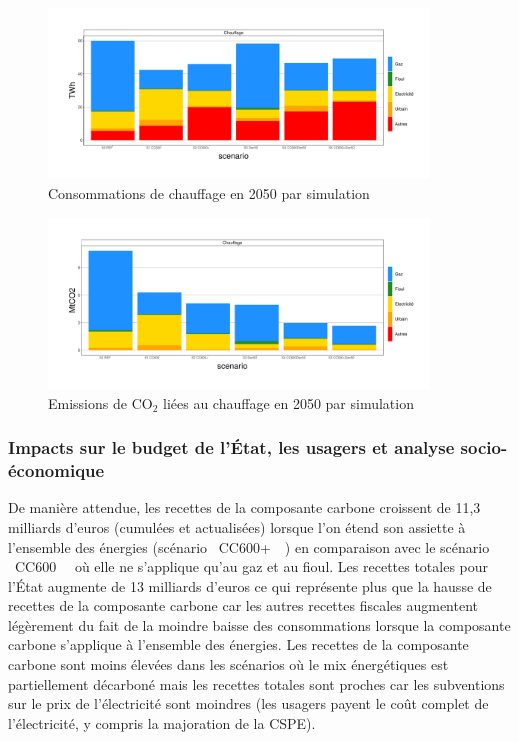 \documentclass[10.5pt,a4paper]{article}
\begin{document}
{\begin{figure}[h!]
\centering 
\caption{Consommations de chauffage en 2050 par simulation}\label{comp_cible_AMS_energie_chauffage-CC}  
\includegraphics[width = 0.9\textwidth]{comp_cible_AMS_energie_chauffage-CC}  
\end{figure}

\begin{figure}[h!]
\centering 
\caption{Emissions de CO$_2$ liées au chauffage en 2050 par simulation}\label{Em_chauffage_2050-CC}  
\includegraphics[width = 0.9\textwidth]{Em_chauffage_2050-CC}  
\end{figure}


\clearpage

\subsubsection{Impacts sur le budget de l’État, les usagers et analyse socio-économique}

De manière attendue, les recettes de la composante carbone croissent de 11,3 milliards d'euros (cumulées et actualisées) lorsque l'on étend son assiette à l'ensemble des énergies (scénario  \og~CC600+~\fg~) en comparaison avec le scénario \og~CC600~\fg~ où elle ne s'applique qu'au gaz et au fioul. Les recettes totales pour l’État augmente de 13 milliards d'euros ce qui représente plus que la hausse de recettes de la composante carbone car les autres recettes fiscales augmentent légèrement du fait de la moindre baisse des consommations lorsque la composante carbone s'applique à l'ensemble des énergies. Les recettes de la composante carbone sont moins élevées dans les scénarios où le mix énergétiques est partiellement décarboné mais les recettes totales sont proches car les subventions sur le prix de l'électricité sont moindres (les usagers payent le coût complet de l'électricité, y compris la majoration de la CSPE).

}
\end{document}
